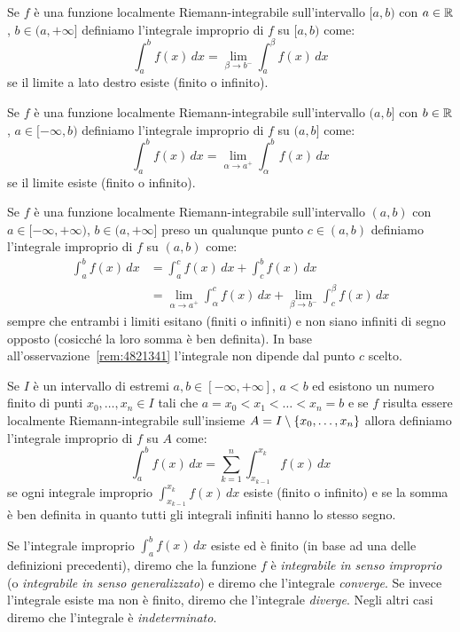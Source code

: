 \begin{definition}
\label{def:integrale_improprio}
Se $f$ è una funzione localmente Riemann-integrabile sull'intervallo $[a,b)$
con $a\in \mathbb R$, $b\in (a,+\infty]$ definiamo l'integrale improprio
di $f$ su $[a,b)$ come:
\[
  \int_a^b f(x)\, dx = \lim_{\beta \to b^-} \int_a^\beta f(x)\, dx
\]
se il limite a lato destro esiste (finito o infinito).

Se $f$ è una funzione localmente Riemann-integrabile sull'intervallo $(a,b]$
con $b\in \mathbb R$, $a\in [-\infty,b)$ definiamo l'integrale improprio
di $f$ su $(a,b]$ come:
\[
  \int_a^b f(x)\, dx = \lim_{\alpha \to a^+} \int_\alpha^b f(x)\, dx
\]
se il limite esiste (finito o infinito).

Se $f$ è una funzione localmente Riemann-integrabile sull'intervallo $(a,b)$
con $a\in [-\infty,+\infty)$, $b\in(a,+\infty]$ preso un qualunque
punto $c\in (a,b)$
definiamo l'integrale improprio di $f$ su $(a,b)$ come:
\begin{align*}
  \int_a^b f(x)\, dx &=
  \int_a^c f(x)\, dx + \int_c^b f(x)\, dx \\
  &= \lim_{\alpha \to a^+}\int_\alpha^c f(x)\,dx
    + \lim_{\beta\to b^-}\int_c^\beta f(x)\, dx
\end{align*}
sempre che entrambi i limiti esitano (finiti o infiniti) e non siano infiniti
di segno opposto (cosicché la loro somma è ben definita). In base
all'osservazione~\ref{rem:4821341} l'integrale non dipende
dal punto $c$ scelto.

Se $I$ è un intervallo di estremi $a,b\in [-\infty, +\infty]$, $a<b$
ed esistono un numero finito di punti $x_0,\dots,x_n \in I$ tali che
$a = x_0 < x_1 < \dots < x_n = b$ e se
$f$ risulta essere localmente Riemann-integrabile sull'insieme
$A=I\setminus{\left\{ x_0, \dots, x_n \right\}}$ allora definiamo
l'integrale improprio di $f$ su $A$ come:
\[
  \int_a^b f(x)\, dx = \sum_{k=1}^n \int_{x_{k-1}}^{x_k} f(x)\, dx
\]
se ogni integrale improprio $\int_{x_{k-1}}^{x_k} f(x)\, dx$ esiste (finito o infinito)
e se la somma è ben definita in quanto tutti gli integrali infiniti
hanno lo stesso segno.

Se l'integrale improprio $\int_a^b f(x)\, dx$ esiste ed è finito
(in base ad una delle definizioni precedenti), diremo che
la funzione $f$ è
\emph{integrabile in senso improprio}
(o \emph{integrabile in senso generalizzato})
e diremo che l'integrale \emph{converge}.
%
%
%
%
Se invece l'integrale esiste ma non è finito, diremo che l'integrale
\emph{diverge}.
%
%
%
%
Negli altri casi diremo che l'integrale è
\emph{indeterminato}.
%
%
%


\end{definition}
